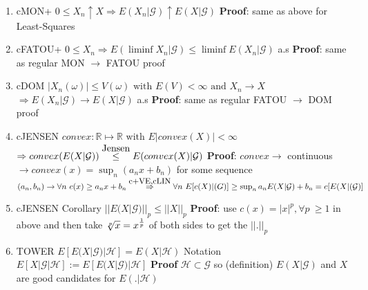 \documentclass[10pt,landscape,a4paper]{article}
\newcommand\myle[1]{\stackrel{{\normalfont\mbox{#1}}}{ \le }}
\newcommand\myright[1]{\stackrel{{\normalfont\mbox{#1}}}{ \Rightarrow }}
\begin{document}
\begin{multicols*}{3}
\begin{spacing}{0.5}
\begin{itemize}
\begin{enumerate}
\item \colorbox{green!10}{cMON+ $0 \le X_n \uparrow X  \Rightarrow E(X_n|\mathcal{G}) \uparrow E(X|\mathcal{G})$} \textbf{Proof}: same as above for Least-Squares

\item \colorbox{green!10}{cFATOU+ $0 \le X_n  \Rightarrow E(\liminf X_n|\mathcal{G}) \le \liminf E(X_n|\mathcal{G})$ a.s  } \textbf{Proof}: same as regular MON $\rightarrow$ FATOU proof

\item \colorbox{green!10}{cDOM $ |X_n(\omega)| \le V(\omega) \text{ with } E(V) <\infty \text{ and } X_n \longrightarrow X$} \\ \colorbox{green!10}{ $\Rightarrow E(X_n|\mathcal{G}) \longrightarrow E(X|\mathcal{G})$ a.s} \textbf{Proof}: same as regular FATOU $\rightarrow$ DOM proof

\item \colorbox{green!10}{cJENSEN $ convex : \mathbb{R} \mapsto \mathbb{R} \text{ with } E|convex(X)| < \infty$} \\ \colorbox{green!10}{ $ \Rightarrow convex(E(X|\mathcal{G})) \myle{Jensen} E(convex(X)|\mathcal{G}) $ } \textbf{Proof}: $convex \rightarrow$ continuous $\rightarrow convex(x)= \sup_n (a_nx+b_n)$ for some sequence $(a_n,b_n) \rightarrow \forall n\ c(x) \ge a_nx +b_n \myright{c+VE,cLIN} \forall n\ E[c(X)|\mathcal(G)] \ge \sup_n a_n E(X|\mathcal{G}) + b_n = c[E(X|\mathcal{(G)]}$  


\item \colorbox{green!10}{cJENSEN Corollary $ {|| E(X|\mathcal{G}) ||}_p \le {||X||}_p $ } \textbf{Proof}: use $c(x)={|x|}^p, \forall p\ \ge 1$ in above and then take $\sqrt[p]{x} = {x}^{1 \over p}$ of both sides to get the  ${|| . ||}_p$

\item \colorbox{green!10}{TOWER $ E [ E (X | \mathcal{G}) | \mathcal{H}] = E (X | \mathcal{H})  $} Notation $E [ X | \mathcal{G} | \mathcal{H}] := E [ E(X | \mathcal{G}) | \mathcal{H}]$ \textbf{Proof} $\mathcal{H} \subset \mathcal{G}$ so (definition) $E(X|\mathcal{G})$ and $X$ are good candidates for $E(.|\mathcal{H})$


\end{enumerate}
\end{itemize}
\end{spacing}
\end{multicols*}
\end{document}
